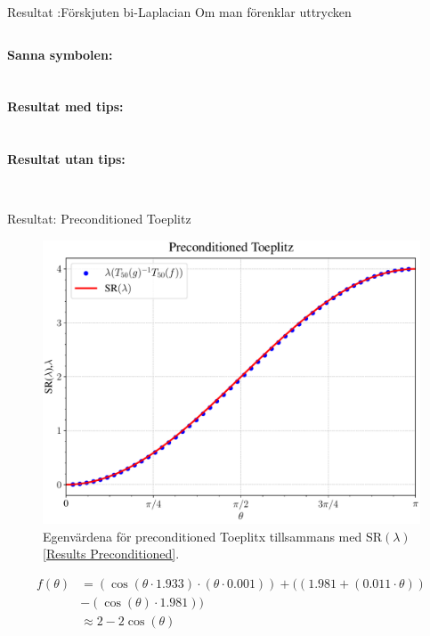 \documentclass{beamer}
\begin{document}
\begin{frame}{Resultat :Förskjuten bi-Laplacian}
    Om man förenklar uttrycken
    
    \begin{columns}
        \textbf{Sanna symbolen:}\\
        \\
        \\
        \textbf{Resultat med tips:}\\
        \\
        \\
        \textbf{Resultat utan tips:}\\
        \\
    \end{columns}
\end{frame}

\begin{frame}{Resultat: Preconditioned Toeplitz}
    \begin{figure}[H]
    \centering
    \includegraphics[width=0.5\linewidth]{images/Precondresults.pdf}
    \caption{Egenvärdena för preconditioned Toeplitx tillsammans med SR$(\lambda)$ \eqref{Results Preconditioned}.}
    \label{Preconditioned result}
\end{figure}
    \begin{align}    
        f(\theta)&=(\cos(\theta \cdot 1.933) \cdot (\theta \cdot 0.001)) + ((1.981 + (0.011 \cdot \theta)) 
        \\&- (\cos(\theta) \cdot 1.981)) \\
        & \approx 2 - 2\cos(\theta)
    \label{Results Preconditioned}
\end{align}

\end{frame}
\end{document}
